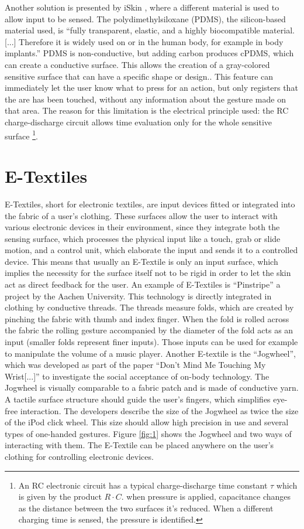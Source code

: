 \documentclass{sigchi}
\begin{document}
Another solution is presented by iSkin \cite{iSkin}, where a different material is used to allow input to be sensed. The polydimethylsiloxane (PDMS), the silicon-based material used, is “fully transparent, elastic, and a highly biocompatible material. [...] Therefore it is widely used on or in the human body, for example in body implants.” \cite[p. 2994]{iSkin} PDMS is non-conductive, but adding carbon produces cPDMS, which can create a conductive surface. This allows the creation of a gray-colored sensitive surface that can have a specific shape or design.. This feature can immediately let the user know what to press for an action, but only registers that the are has been touched, without any information about the gesture made on that area. The reason for this limitation is the electrical principle used: the RC charge-discharge circuit allows time evaluation only for the whole sensitive surface \footnote{An RC electronic circuit has a typical charge-discharge time constant $\tau$ which is given by the product $R \cdot C$. when pressure is applied, capacitance changes as the distance between the two surfaces it’s reduced. When a different charging time is sensed, the pressure is identified.}.

\section{E-Textiles}
E-Textiles, short for electronic textiles, are input devices fitted or integrated into the fabric of a user's clothing. These surfaces allow the user to interact with various electronic devices in their environment, since they integrate both the sensing surface, which processes the physical input like a touch, grab or slide motion,  and a control unit, which elaborate the input and sends it to a controlled device. This means that usually an E-Textile is only an input surface, which implies the necessity for the surface itself not to be rigid in order to let the skin act as direct feedback for the user.
An example of E-Textiles is ``Pinstripe'' a project by the Aachen University\cite{pinstripe}. This technology is directly integrated in clothing by conductive threads. The threads measure folds, which are created by pinching the fabric with thumb and index finger. When the fold is rolled across the fabric the rolling gesture accompanied by the diameter of the fold acts as an input (smaller folds represent finer inputs). Those inputs can be used for example to manipulate the volume of a music player. %
Another E-textile is the ``Jogwheel'', which was developed as part of the paper ``Don't Mind Me Touching My Wrist[...]'' \cite{touch-wrist} to investigate the social acceptance of on-body technology. The Jogwheel is visually comparable to a fabric patch and is made of conductive yarn. A tactile surface structure should guide the user's fingers, which simplifies eye-free interaction. The developers describe the size of the Jogwheel as twice the size of the iPod click wheel. This size should allow high precision in use and several types of one-handed gestures.
Figure \ref{fig:1} shows the Jogwheel and two ways of interacting with them. The E-Textile can be placed anywhere on the user's clothing for controlling electronic devices. \cite{touch-wrist}
\end{document}
